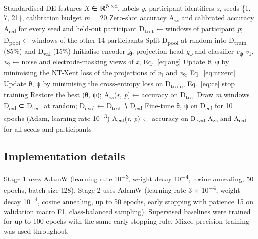 \begin{algorithm}[!htbp]
\caption{CLISA-EWU leave-one-participant-out training and evaluation}
\label{alg:clisa}
\small
\begin{algorithmic}[1]
\Require Standardised DE features \emph{X} ∈ ℝ\textsuperscript{N×d}, labels \emph{y}, participant identifiers \emph{s}, seeds \{1, 7, 21\}, calibration budget \emph{m} = 20
\Ensure Zero-shot accuracy A\textsubscript{zs} and calibrated accuracy A\textsubscript{cal} for every seed and held-out participant
\State D\textsubscript{test} ← windows of participant \emph{p}; D\textsubscript{pool} ← windows of the other 14 participants
\State Split D\textsubscript{pool} at random into D\textsubscript{train} (85\%) and D\textsubscript{val} (15\%)
\State Initialise encoder \emph{f}\textsubscript{θ}, projection head \emph{g}\textsubscript{φ} and classifier \emph{c}\textsubscript{ψ}
 
\State \emph{v}\textsubscript{1}, \emph{v}\textsubscript{2} ← noise and electrode-masking views of \emph{x}, Eq.~\eqref{eq:aug}
\State Update θ, φ by minimising the NT-Xent loss of the projections of \emph{v}\textsubscript{1} and \emph{v}\textsubscript{2}, Eq.~\eqref{eq:ntxent}
\EndFor
\EndFor
{} 
\State Update θ, ψ by minimising the cross-entropy loss on D\textsubscript{train}, Eq.~\eqref{eq:ce}
\State stop training
\EndIf
\EndFor
\State Restore the best (θ, ψ); A\textsubscript{zs}(\emph{r}, \emph{p}) ← accuracy on D\textsubscript{test} 
\State Draw \emph{m} windows D\textsubscript{cal} ⊂ D\textsubscript{test} at random; D\textsubscript{eval} ← D\textsubscript{test} ∖ D\textsubscript{cal}
\State Fine-tune θ, ψ on D\textsubscript{cal} for 10 epochs (Adam, learning rate 10\textsuperscript{−3})
\State A\textsubscript{cal}(\emph{r}, \emph{p}) ← accuracy on D\textsubscript{eval} 
\EndFor
\EndFor
\State \Return A\textsubscript{zs} and A\textsubscript{cal} for all seeds and participants
\end{algorithmic}
\end{algorithm}


\subsection{Implementation details}
Stage 1 uses AdamW (learning rate 10\textsuperscript{−3}, weight decay 10\textsuperscript{−4}, cosine annealing, 50 epochs, batch size 128). Stage 2 uses AdamW (learning rate 3 × 10\textsuperscript{−4}, weight decay 10\textsuperscript{−4}, cosine annealing, up to 50 epochs, early stopping with patience 15 on validation macro F1, class-balanced sampling). Supervised baselines were trained for up to 100 epochs with the same early-stopping rule. Mixed-precision training was used throughout.

